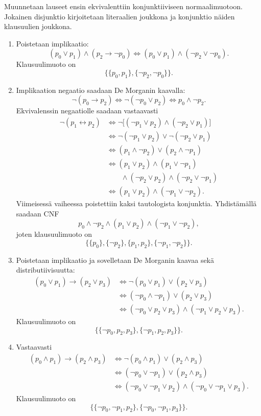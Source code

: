 \documentclass[11pt,a4paper]{amsart}
\begin{document}
\begin{solution}
Muunnetaan lauseet ensin ekvivalenttiin konjunktiiviseen normaalimuotoon.
Jokainen disjunktio kirjoitetaan literaalien joukkona ja konjunktio
näiden klausuulien joukkona.
\begin{enumerate}[label=\alph*)]
\item Poistetaan implikaatio:
  \[
    (p_0 \lor p_1) \land (p_2 \to \neg p_0)
    \iff (p_0 \lor p_1) \land (\neg p_2 \lor \neg p_0).
  \]
  Klausuulimuoto on
  \[
    \big\{\{p_0,p_1\},\{\neg p_2,\neg p_0\}\big\}.
  \]

\item Implikaation negaatio saadaan De Morganin kaavalla:
  \[
    \neg(p_0 \to p_2)
    \iff \neg(\neg p_0 \lor p_2)
    \iff p_0 \land \neg p_2.
  \]
  Ekvivalenssin negaatiolle saadaan vastaavasti
  \[
    \begin{aligned}
      \neg(p_1 \leftrightarrow p_2)
      &\iff \neg\big[(\neg p_1 \lor p_2)\land(\neg p_2 \lor p_1)\big] \\
      &\iff \neg(\neg p_1 \lor p_2)\lor\neg(\neg p_2 \lor p_1) \\
      &\iff (p_1\land\neg p_2)\lor(p_2\land\neg p_1) \\
      &\iff (p_1\lor p_2)\land(p_1\lor\neg p_1) \\
      &\qquad\land(\neg p_2\lor p_2)\land(\neg p_2\lor\neg p_1) \\
      &\iff (p_1\lor p_2)\land(\neg p_1\lor\neg p_2).
    \end{aligned}
  \]
  Viimeisessä vaiheessa poistettiin kaksi tautologista konjunktia.
  Yhdistämällä saadaan CNF
  \[
    p_0\land\neg p_2\land(p_1\lor p_2)\land(\neg p_1\lor\neg p_2),
  \]
  joten klausuulimuoto on
  \[
    \big\{\{p_0\},\{\neg p_2\},\{p_1,p_2\},\{\neg p_1,\neg p_2\}\big\}.
  \]

\item Poistetaan implikaatio ja sovelletaan De Morganin kaavaa sekä
  distributiivisuutta:
  \[
    \begin{aligned}
      (p_0\lor p_1)\to(p_2\lor p_3)
      &\iff \neg(p_0\lor p_1)\lor(p_2\lor p_3) \\
      &\iff (\neg p_0\land\neg p_1)\lor(p_2\lor p_3) \\
      &\iff (\neg p_0\lor p_2\lor p_3)
      \land(\neg p_1\lor p_2\lor p_3).
    \end{aligned}
  \]
  Klausuulimuoto on
  \[
    \big\{\{\neg p_0,p_2,p_3\},\{\neg p_1,p_2,p_3\}\big\}.
  \]

\item Vastaavasti
  \[
    \begin{aligned}
      (p_0\land p_1)\to(p_2\land p_3)
      &\iff \neg(p_0\land p_1)\lor(p_2\land p_3) \\
      &\iff (\neg p_0\lor\neg p_1)\lor(p_2\land p_3) \\
      &\iff (\neg p_0\lor\neg p_1\lor p_2)
      \land(\neg p_0\lor\neg p_1\lor p_3).
    \end{aligned}
  \]
  Klausuulimuoto on
  \[
    \big\{\{\neg p_0,\neg p_1,p_2\},\{\neg p_0,\neg p_1,p_3\}\big\}.
  \]


\end{enumerate}
\end{solution}
\end{document}
